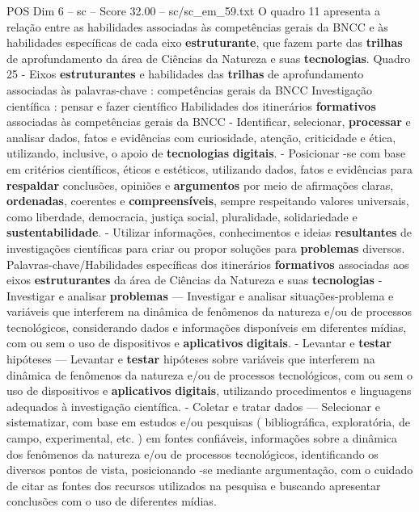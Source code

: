 \begin{textsample}{POS Dim 6 – sc – Score 32.00 – sc/sc\_em\_59.txt}
O quadro 11 apresenta a relação entre as habilidades associadas às competências gerais da BNCC e às habilidades específicas de cada eixo \textbf{estruturante}, que fazem parte das \textbf{trilhas} de aprofundamento da área de Ciências da Natureza e suas \textbf{tecnologias}.
Quadro 25 - Eixos \textbf{estruturantes} e habilidades das \textbf{trilhas} de aprofundamento associadas às palavras-chave : competências gerais da BNCC Investigação científica : pensar e fazer científico Habilidades dos itinerários \textbf{formativos} associadas às competências gerais da BNCC - Identificar, selecionar, \textbf{processar} e analisar dados, fatos e evidências com curiosidade, atenção, criticidade e ética, utilizando, inclusive, o apoio de \textbf{tecnologias} \textbf{digitais}. - Posicionar -se com base em critérios científicos, éticos e estéticos, utilizando dados, fatos e evidências para \textbf{respaldar} conclusões, opiniões e \textbf{argumentos} por meio de afirmações claras, \textbf{ordenadas}, coerentes e \textbf{compreensíveis}, sempre respeitando valores universais, como liberdade, democracia, justiça social, pluralidade, solidariedade e \textbf{sustentabilidade}. - Utilizar informações, conhecimentos e ideias \textbf{resultantes} de investigações científicas para criar ou propor soluções para \textbf{problemas} diversos.
Palavras-chave/Habilidades específicas dos itinerários \textbf{formativos} associadas aos eixos \textbf{estruturantes} da área de Ciências da Natureza e suas \textbf{tecnologias} - Investigar e analisar \textbf{problemas} — Investigar e analisar situações-problema e variáveis que interferem na dinâmica de fenômenos da natureza e/ou de processos tecnológicos, considerando dados e informações disponíveis em diferentes mídias, com ou sem o uso de dispositivos e \textbf{aplicativos} \textbf{digitais}. - Levantar e \textbf{testar} hipóteses — Levantar e \textbf{testar} hipóteses sobre variáveis que interferem na dinâmica de fenômenos da natureza e/ou de processos tecnológicos, com ou sem o uso de dispositivos e \textbf{aplicativos} \textbf{digitais}, utilizando procedimentos e linguagens adequados à investigação científica. - Coletar e tratar dados — Selecionar e sistematizar, com base em estudos e/ou pesquisas ( bibliográfica, exploratória, de campo, experimental, etc. ) em fontes confiáveis, informações sobre a dinâmica dos fenômenos da natureza e/ou de processos tecnológicos, identificando os diversos pontos de vista, posicionando -se mediante argumentação, com o cuidado de citar as fontes dos recursos utilizados na pesquisa e buscando apresentar conclusões com o uso de diferentes mídias.

\end{textsample}
